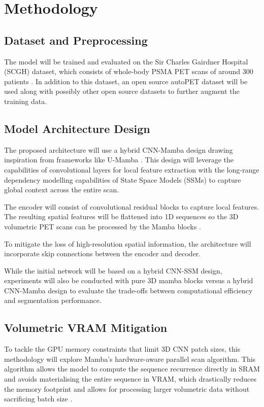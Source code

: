 \documentclass{article}
\begin{document}

\section{Methodology}

\subsection{Dataset and Preprocessing}
The model will be trained and evaluated on the Sir Charles Gairdner Hospital (SCGH) dataset, which consists of whole-body PSMA PET 
scans of around 300 patients \cite{mccarthy2019multicenter}. In addition to this dataset, an open source autoPET dataset will be used along with possibly other open
source datasets to further augment the training data. 



\subsection{Model Architecture Design}
The proposed architecture will use a hybrid CNN-Mamba design drawing inspiration from frameworks like U-Mamba \cite{ma2024umamba}. 
This design will leverage the capabilities of convolutional layers for local feature extraction with the long-range dependency
modelling capabilities of State Space Models (SSMs) to capture global context across the entire scan.

The encoder will consist of convolutional residual blocks to capture local features. The resulting spatial features will be flattened
into 1D sequences so the 3D volumetric PET scans can be processed by the Mamba blocks \cite{ma2024umamba}.

To mitigate the loss of high-resolution spatial information, the architecture will incorporate skip connections between the encoder
and decoder. 

While the initial network will be based on a hybrid CNN-SSM design, experiments will also be conducted with pure 3D mamba blocks versus a hybrid
CNN-Mamba design to evaluate the trade-offs between computational efficiency and segmentation performance.

\subsection{Volumetric VRAM Mitigation}
To tackle the GPU memory constraints that limit 3D CNN patch sizes, this methodology will explore Mamba's hardware-aware parallel scan
algorithm. This algorithm allows the model to compute the sequence recurrence directly in SRAM and avoids materialising the entire
sequence in VRAM, which drastically reduces the memory footprint and allows for processing larger volumetric data without sacrificing
batch size \cite{gu2023mamba}.
\end{document}
